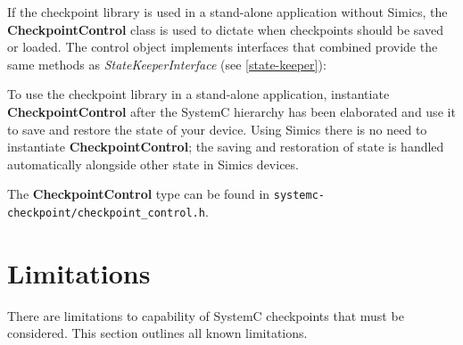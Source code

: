 \documentclass[oneside]{memoir}
\begin{document}
If the checkpoint library is used in a stand-alone application without Simics, the \textbf{CheckpointControl} class is used to dictate when checkpoints should be saved or loaded.
The control object implements interfaces that combined provide the same methods as \textit{StateKeeperInterface}
(see \ref{state-keeper}):




To use the checkpoint library in a stand-alone application, instantiate \textbf{CheckpointControl} after the SystemC hierarchy has been elaborated and use it to save and restore the state of your device.
Using Simics there is no need to instantiate \textbf{CheckpointControl}; the saving and restoration of state is handled automatically alongside other state in Simics devices.

The \textbf{CheckpointControl} type can be found in \texttt{systemc-checkpoint/checkpoint\_control.h}.

\chapter{Limitations}
\label{limitations}

There are limitations to capability of SystemC checkpoints that must be considered.
This section outlines all known limitations.
\end{document}
